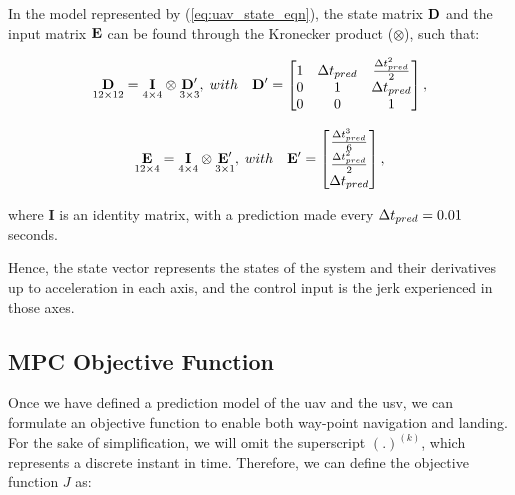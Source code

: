 \documentclass[letterpaper, 10 pt, journal, twoside]{IEEEtran}
\begin{document}
In the model represented by (\ref{eq:uav_state_eqn}), the state matrix $\mathbf{D}$ and the input matrix $\mathbf{E}$ can be found through the Kronecker product ($\otimes$), such that:
\begin{small}
\begin{equation}
    \underset{12\times12}{\mathbf{D}} =
    \underset{4\times4}{\mathbf{I}} \otimes \underset{3\times3}{\mathbf{D'}},\; with \quad
    \mathbf{D'} = \begin{bmatrix}
    1 & \Delta t_{pred} & \frac{\Delta t_{pred}^2}{2}\\
    0 & 1 & \Delta t_{pred}\\
    0 & 0 & 1
    \end{bmatrix},
\end{equation}
\end{small}


\begin{small}
\begin{equation}
   \underset{12\times4}{\mathbf{E}} = \underset{4\times4}{\mathbf{I}} \otimes \underset{3\times1}{\mathbf{E'}},\; with \quad
   \mathbf{E'} = 
   \begin{bmatrix}
      \frac{\Delta t_{pred}^3}{6} \\
      \frac{\Delta t_{pred}^2}{2} \\
      \Delta t_{pred} 
   \end{bmatrix},
\end{equation}
\end{small}

\noindent where $\mathbf{I}$ is an identity matrix, with a prediction made every $\Delta t_{pred} = 0.01$ seconds.

Hence, the state vector represents the states of the system and their derivatives up to acceleration in each axis, and the control input is the jerk experienced in those axes.


\subsection{MPC Objective Function}

Once we have defined a prediction model of the \ac{uav} and the \ac{usv}, we can formulate an objective function to enable both way-point navigation and landing. For the sake of simplification, we will omit the superscript $(.)^{(k)}$, which represents a discrete instant in time. Therefore, we can define the objective function $J$ as:
\end{document}
